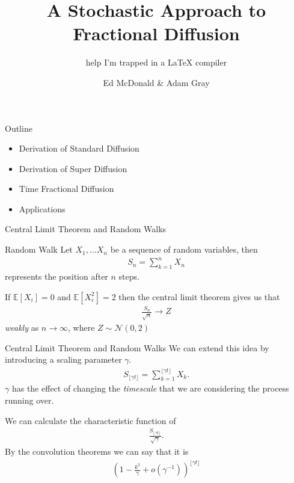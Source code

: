 \documentclass[pdf]{beamer}
\title{A Stochastic Approach to Fractional Diffusion}
\subtitle{help I'm trapped in a LaTeX compiler}
\author{Ed McDonald \& Adam Gray}
\institute{
	School of Mathematics and Statistics \\
	University of New South Wales
}
\newcommand{\lra}{\longrightarrow}
\begin{document}
\begin{frame}
	\titlepage
\end{frame}

\begin{frame}{Outline}
    \begin{itemize}
        \item Derivation of Standard Diffusion
        \item Derivation of Super Diffusion
        \item Time Fractional Diffusion
        \item Applications
    \end{itemize}
\end{frame}


\begin{frame}{Central Limit Theorem and Random Walks}
	\begin{block}{Random Walk}
	    Let $ X_1, \ldots X_n $ be a sequence of random variables,
	    then 
	    \begin{align}
	        S_n = \sum_{k=1}^n X_n 
	    \end{align}
	    represents the position after $ n $ steps.
	\end{block}
	If $ \mathbb{E}[X_i] = 0 $ and  $ \mathbb{E}[X_i^2] = 2 $ then the central limit theorem gives us that
	\begin{align}
	    \frac{S_n}{\sqrt{n}} \lra Z
	\end{align}
	\emph{weakly} as $ n \lra \infty $, where $ Z \sim \mathcal{N}(0,2) $
\end{frame}

\begin{frame}{Central Limit Theorem and Random Walks}
    We can extend this idea by introducing a scaling parameter $ \gamma $.
    \begin{align}
        S_{\lfloor \gamma t \rfloor} = \sum_{k=1}^{\lfloor \gamma t \rfloor} X_k.
    \end{align}
    $ \gamma $ has the effect of changing the \emph{timescale} that we are considering the process running over.
    
    We can calculate the characteristic function of 
    \begin{align}
       \frac{S_{\lfloor \gamma t \rfloor}}{\sqrt{\gamma }}.
    \end{align}
    By the convolution theorems we can say that it is
    \begin{align}
        \left( 1- \frac{k^2}{\gamma} + o(\gamma^{-1}) \right)^{\lfloor \gamma t \rfloor}
    \end{align}
\end{frame}
\end{document}
